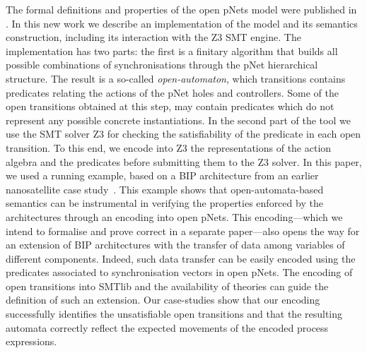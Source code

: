 \documentclass{lncs/llncs}
\newcommand{\mdash}{---}
\begin{document}
The formal definitions and properties of the open pNets model were
published in \cite{henrio:Forte2016}. In this new work we describe an implementation of
the model and its semantics construction, including its interaction
with the Z3 SMT engine.
The implementation has two parts: the first is a finitary algorithm
that builds all possible combinations of synchronisations through the
pNet hierarchical structure. The result is a so-called
\emph{open-automaton}, which transitions contains predicates relating
the actions of the pNet holes and controllers. Some of the open
transitions obtained at this step,  may
contain predicates which do not represent any possible concrete
instantiations. 
In the second part of the tool we use the SMT solver Z3 for checking the
satisfiability of the predicate in each open transition. 
To this end, we encode into Z3 the representations of the action algebra and
the predicates before submitting them to the
Z3 solver. 
%
%
In this paper, we used a running example, based on a BIP
architecture from an earlier nanosatellite case
study~\cite{CubETH-case-study}.  This example shows that
open-automata-based semantics can be instrumental in verifying the
properties enforced by the architectures through an encoding into open
pNets.  This encoding\mdash which we intend to formalise and prove
correct in a separate paper\mdash also opens the way for an extension
of BIP architectures with the transfer of data among variables of
different components.  Indeed, such data transfer can be easily
encoded using the predicates associated to synchronisation vectors in
open pNets.  The encoding of open transitions into SMTlib and the
availability of theories can guide the definition of such an extension.
%
%
Our case-studies show that our encoding
successfully identifies the unsatisfiable open transitions and that
the resulting automata correctly reflect the expected 
movements of the encoded process expressions.   

\end{document}
